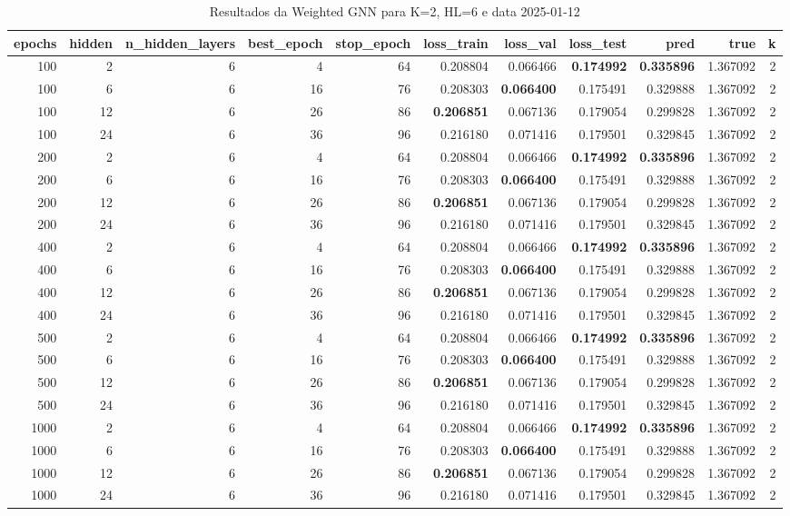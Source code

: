 \begin{table}
\caption{Resultados da Weighted GNN para K=2, HL=6 e data 2025-01-12}
\label{tab:weighted_gnn_results_k2_hl6_d20250112}
\begin{tabular}{rrrrrrrrrrr}
\toprule
epochs & hidden & n\_hidden\_layers & best\_epoch & stop\_epoch & loss\_train & loss\_val & loss\_test & pred & true & k \\
\midrule
100 & 2 & 6 & 4 & 64 & 0.208804 & 0.066466 & \textbf{0.174992} & \textbf{0.335896} & 1.367092 & 2 \\
100 & 6 & 6 & 16 & 76 & 0.208303 & \textbf{0.066400} & 0.175491 & 0.329888 & 1.367092 & 2 \\
100 & 12 & 6 & 26 & 86 & \textbf{0.206851} & 0.067136 & 0.179054 & 0.299828 & 1.367092 & 2 \\
100 & 24 & 6 & 36 & 96 & 0.216180 & 0.071416 & 0.179501 & 0.329845 & 1.367092 & 2 \\
200 & 2 & 6 & 4 & 64 & 0.208804 & 0.066466 & \textbf{0.174992} & \textbf{0.335896} & 1.367092 & 2 \\
200 & 6 & 6 & 16 & 76 & 0.208303 & \textbf{0.066400} & 0.175491 & 0.329888 & 1.367092 & 2 \\
200 & 12 & 6 & 26 & 86 & \textbf{0.206851} & 0.067136 & 0.179054 & 0.299828 & 1.367092 & 2 \\
200 & 24 & 6 & 36 & 96 & 0.216180 & 0.071416 & 0.179501 & 0.329845 & 1.367092 & 2 \\
400 & 2 & 6 & 4 & 64 & 0.208804 & 0.066466 & \textbf{0.174992} & \textbf{0.335896} & 1.367092 & 2 \\
400 & 6 & 6 & 16 & 76 & 0.208303 & \textbf{0.066400} & 0.175491 & 0.329888 & 1.367092 & 2 \\
400 & 12 & 6 & 26 & 86 & \textbf{0.206851} & 0.067136 & 0.179054 & 0.299828 & 1.367092 & 2 \\
400 & 24 & 6 & 36 & 96 & 0.216180 & 0.071416 & 0.179501 & 0.329845 & 1.367092 & 2 \\
500 & 2 & 6 & 4 & 64 & 0.208804 & 0.066466 & \textbf{0.174992} & \textbf{0.335896} & 1.367092 & 2 \\
500 & 6 & 6 & 16 & 76 & 0.208303 & \textbf{0.066400} & 0.175491 & 0.329888 & 1.367092 & 2 \\
500 & 12 & 6 & 26 & 86 & \textbf{0.206851} & 0.067136 & 0.179054 & 0.299828 & 1.367092 & 2 \\
500 & 24 & 6 & 36 & 96 & 0.216180 & 0.071416 & 0.179501 & 0.329845 & 1.367092 & 2 \\
1000 & 2 & 6 & 4 & 64 & 0.208804 & 0.066466 & \textbf{0.174992} & \textbf{0.335896} & 1.367092 & 2 \\
1000 & 6 & 6 & 16 & 76 & 0.208303 & \textbf{0.066400} & 0.175491 & 0.329888 & 1.367092 & 2 \\
1000 & 12 & 6 & 26 & 86 & \textbf{0.206851} & 0.067136 & 0.179054 & 0.299828 & 1.367092 & 2 \\
1000 & 24 & 6 & 36 & 96 & 0.216180 & 0.071416 & 0.179501 & 0.329845 & 1.367092 & 2 \\
\bottomrule
\end{tabular}
\end{table}

